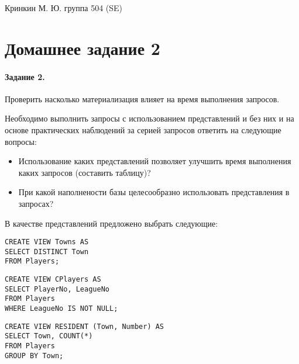 \documentclass[a4paper,12pt]{article}
\begin{document}
\sloppy

\lstset{
	basicstyle=\small,
	stringstyle=\ttfamily,
	showstringspaces=false,
	columns=fixed,
	breaklines=true,
	numbers=right,
	numberstyle=\tiny
}

\newtheorem{Def}{Определение}[section]
\newtheorem{Th}{Теорема}
\newtheorem{Lem}[Th]{Лемма}
\newenvironment{Proof}
	{\par\noindent{\bf Доказательство.}}
	{\hfill$\scriptstyle\blacksquare$}
\newenvironment{Solution}
	{\par\noindent{\bf Решение.}}
	{\hfill$\scriptstyle\blacksquare$}


\begin{flushright}
	Кринкин М. Ю. группа 504 (SE)
\end{flushright}

\section{Домашнее задание 2}

\paragraph{Задание 2.} Проверить насколько материализация влияет на время выполнения запросов.

Необходимо выполнить запросы с использованием представлений и без них и на основе практических наблюдений за серией запросов ответить на следующие вопросы:
\begin{itemize}
\item Использование каких представлений позволяет улучшить время выполнения каких запросов (составить таблицу)?

\item При какой наполнености базы целесообразно использовать представления в запросах?
\end{itemize}

В качестве представлений предложено выбрать следующие:
\begin{lstlisting}
CREATE VIEW Towns AS
SELECT DISTINCT Town
FROM Players;
\end{lstlisting}

\begin{lstlisting}
CREATE VIEW CPlayers AS
SELECT PlayerNo, LeagueNo
FROM Players
WHERE LeagueNo IS NOT NULL;
\end{lstlisting}

\begin{lstlisting}
CREATE VIEW RESIDENT (Town, Number) AS
SELECT Town, COUNT(*)
FROM Players
GROUP BY Town;
\end{lstlisting}
\end{document}
